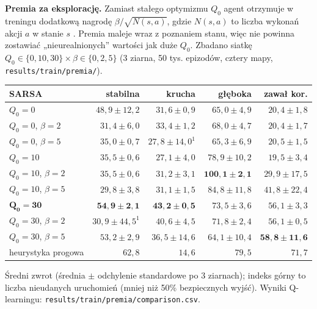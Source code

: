 \documentclass[11pt,a4paper]{article}
\begin{document}
\textbf{Premia za eksplorację.} Zamiast stałego optymizmu $Q_0$ agent otrzymuje
w treningu dodatkową nagrodę $\beta/\sqrt{N(s,a)}$, gdzie $N(s,a)$ to liczba
wykonań akcji $a$ w stanie $s$ \cite{sutton}. Premia maleje wraz z poznaniem stanu,
więc nie powinna zostawiać „nieurealnionych” wartości jak duże $Q_0$. Zbadano siatkę
$Q_0\in\{0,10,30\}\times\beta\in\{0,2,5\}$ (3 ziarna, 50 tys. epizodów, cztery mapy,
\texttt{results/train/premia/}).

\begin{center}
\small
\begin{tabular}{@{}lrrrr@{}}
\toprule
SARSA & stabilna & krucha & głęboka & zawał kor. \\
\midrule
$Q_0=0$ & $48{,}9 \pm 12{,}2$ & $31{,}6 \pm 0{,}9$ & $65{,}0 \pm 4{,}9$ & $20{,}4 \pm 1{,}8$ \\
$Q_0=0$, $\beta=2$ & $31{,}4 \pm 6{,}0$ & $33{,}4 \pm 1{,}2$ & $68{,}0 \pm 4{,}7$ & $20{,}4 \pm 1{,}7$ \\
$Q_0=0$, $\beta=5$ & $35{,}0 \pm 0{,}7$ & $27{,}8 \pm 14{,}0^{1}$ & $65{,}3 \pm 6{,}9$ & $20{,}5 \pm 1{,}5$ \\
$Q_0=10$ & $35{,}5 \pm 0{,}6$ & $27{,}1 \pm 4{,}0$ & $78{,}9 \pm 10{,}2$ & $19{,}5 \pm 3{,}4$ \\
$Q_0=10$, $\beta=2$ & $35{,}5 \pm 0{,}6$ & $31{,}2 \pm 3{,}1$ & $\mathbf{100{,}1 \pm 2{,}1}$ & $29{,}9 \pm 17{,}5$ \\
$Q_0=10$, $\beta=5$ & $29{,}8 \pm 3{,}8$ & $31{,}1 \pm 1{,}5$ & $84{,}8 \pm 11{,}8$ & $41{,}8 \pm 22{,}4$ \\
$\mathbf{Q_0=30}$ & $\mathbf{54{,}9 \pm 2{,}1}$ & $\mathbf{43{,}2 \pm 0{,}5}$ & $73{,}5 \pm 3{,}6$ & $56{,}1 \pm 3{,}3$ \\
$Q_0=30$, $\beta=2$ & $30{,}9 \pm 44{,}5^{1}$ & $40{,}6 \pm 4{,}5$ & $71{,}8 \pm 2{,}4$ & $56{,}1 \pm 0{,}5$ \\
$Q_0=30$, $\beta=5$ & $53{,}2 \pm 2{,}9$ & $36{,}5 \pm 14{,}6$ & $64{,}1 \pm 10{,}4$ & $\mathbf{58{,}8 \pm 11{,}6}$ \\
\midrule
heurystyka progowa & $62{,}8$ & $14{,}6$ & $79{,}5$ & $71{,}7$ \\
\bottomrule
\end{tabular}
\end{center}
Średni zwrot (średnia $\pm$ odchylenie standardowe po 3 ziarnach); indeks górny to
liczba nieudanych uruchomień (mniej niż 50\% bezpiecznych wyjść). Wyniki
Q-learningu: \texttt{results/train/premia/comparison.csv}.
\end{document}
